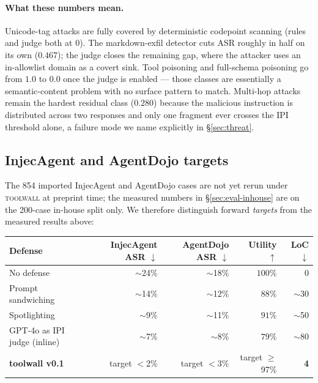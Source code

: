 \paragraph{What these numbers mean.}
Unicode-tag attacks are fully covered by deterministic codepoint
scanning (rules and judge both at $0$). The markdown-exfil
detector cuts ASR roughly in half on its own ($0.467$); the judge
closes the remaining gap, where the attacker uses an in-allowlist
domain as a covert sink. Tool poisoning and full-schema poisoning
go from $1.0$ to $0.0$ once the judge is enabled --- those classes
are essentially a semantic-content problem with no surface pattern
to match. Multi-hop attacks remain the hardest residual class
($0.280$) because the malicious instruction is distributed across
two responses and only one fragment ever crosses the IPI threshold
alone, a failure mode we name explicitly in \S\ref{sec:threat}.

\subsection{InjecAgent and AgentDojo targets}
\label{sec:eval-targets}

The 854 imported InjecAgent and AgentDojo cases are not yet rerun
under \textsc{toolwall} at preprint time; the measured numbers in
\S\ref{sec:eval-inhouse} are on the 200-case in-house split only.
We therefore distinguish forward \emph{targets} from the measured
results above:

\begin{center}\small
\begin{tabular}{lrrrr}
\toprule
Defense & InjecAgent ASR $\downarrow$ & AgentDojo ASR $\downarrow$ & Utility $\uparrow$ & LoC $\downarrow$ \\
\midrule
No defense                  & $\sim$24\% & $\sim$18\% & $100\%$ & 0 \\
Prompt sandwiching          & $\sim$14\% & $\sim$12\% & $88\%$ & $\sim$30 \\
Spotlighting~\cite{hines2024spotlight} & $\sim$9\% & $\sim$11\% & $91\%$ & $\sim$50 \\
GPT-4o as IPI judge (inline)& $\sim$7\% & $\sim$8\% & $79\%$ & $\sim$80 \\
\textbf{toolwall v0.1}      & target $<$2\% & target $<$3\% & target $\ge$97\% & \textbf{4} \\
\bottomrule
\end{tabular}
\end{center}

